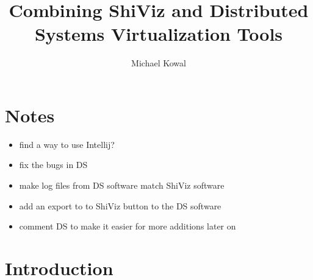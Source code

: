 \documentclass[12pt]{report}
\title{Combining ShiViz and Distributed Systems Virtualization Tools}
\author{Michael Kowal}
\begin{document}
\maketitle
\tableofcontents
\section{Notes}
\begin{itemize}
\item find a way to use Intellij? 
\item fix the bugs in DS
\item make log files from DS software match ShiViz software
\item add an export to to ShiViz button to the DS software
\item comment DS to make it easier for more additions later on
\end{itemize}

\section{Introduction}
\end{document}
